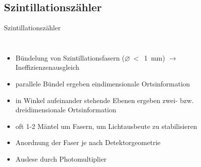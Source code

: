 
	
\subsection[]{Szintillationszähler}



\begin{frame}{Szintillationszähler}
	\begin{columns}[T]
			\begin{itemize}
			  \item Bündelung von Szintillationsfasern ($\varnothing~<$~1~mm) $\rightarrow$
			  Ineffizienzenausgleich
			  \item parallele Bündel ergeben eindimensionale Ortsinformation
			  \item in Winkel aufeinander stehende Ebenen ergeben zwei- bzw. dreidimensionale Ortsinformation
			  \item oft 1-2 Mäntel um Fasern, um Lichtausbeute zu stabilisieren
			  \item Anordnung der Faser je nach Detektorgeometrie
			  \item Auslese durch Photomultiplier
			\end{itemize}	
	    	\begin{figure}[htbp]
			  \centering
			  
			\end{figure}
    \end{columns}
\end{frame}	

